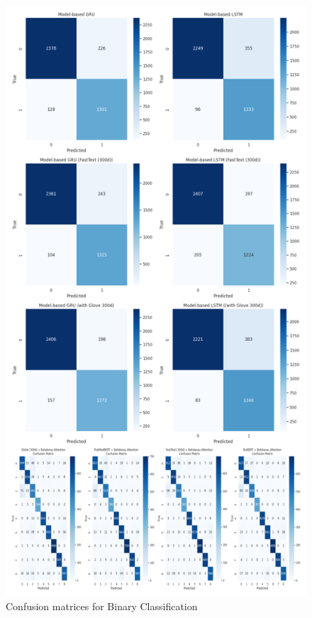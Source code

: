 \documentclass[12pt]{report}
\begin{document}
\begin{figure}[H]
\centering
\includegraphics[width=0.8\linewidth]{cm_binary.png}
\caption{Confusion matrices for Binary Classification}
\label{fig:cm_binary}
\end{figure}
\end{document}

